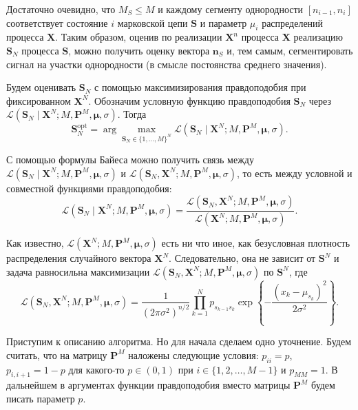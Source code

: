 Достаточно очевидно, что \(M_{S} \leq M\) и каждому сегменту однородности 
\([n_{i - 1}, n_{i}]\) соответствует состояние \(i\) марковской цепи 
\(\mathbf{S}\) и параметр \(\mu_{i}\) распределений процесса \(\mathbf{X}\). 
Таким образом, оценив по реализации \(\mathbf{X}^{n}\) процесса \(\mathbf{X}\) 
реализацию \(\mathbf{S}_{N}\) процесса \(\mathbf{S}\), можно получить оценку 
вектора \(\mathbf{n}_{S}\) и, тем самым, сегментировать сигнал на участки 
однородности (в смысле постоянства среднего значения).

Будем оценивать \(\mathbf{S}_{N}\) с помощью максимизирования правдоподобия при 
фиксированном \(\mathbf{X}^{N}\). Обозначим условную функцию правдоподобия 
\(\mathbf{S}_{N}\) через \(\mathcal{L}(\mathbf{S}_{N} \mid \mathbf{X}^{N}; M, 
\mathbf{P}^{M}, \bm{\mu}, \sigma)\). Тогда
\[
	\mathbf{S}_{N}^{\mathrm{opt}} = \arg\max\limits_{\mathbf{S}_{N} \in \{1, 
	\ldots, M\}^{N}} \mathcal{L}(\mathbf{S}_{N} \mid \mathbf{X}^{N}; M, 
	\mathbf{P}^{M}, \bm{\mu}, \sigma).
\]

С помощью формулы Байеса можно получить связь между \(\mathcal{L} 
(\mathbf{S}_{N} \mid \mathbf{X}^{N}; M, \mathbf{P}^{M}, \bm{\mu}, \sigma)\) и 
\(\mathcal{L}(\mathbf{S}_{N}, \mathbf{X}^{N}; M, \mathbf{P}^{M}, \bm{\mu}, 
\sigma)\), то есть между условной и совместной функциями правдоподобия:
\[
	\mathcal{L}(\mathbf{S}_{N} \mid \mathbf{X}^{N}; M, \mathbf{P}^{M}, 
	\bm{\mu}, \sigma) = \frac{\mathcal{L}(\mathbf{S}_{N}, \mathbf{X}^{N}; M, 
	\mathbf{P}^{M}, \bm{\mu}, \sigma)}{\mathcal{L}(\mathbf{X}^{N}; M, 
	\mathbf{P}^{M}, \bm{\mu}, \sigma)}.
\]

Как известно, \(\mathcal{L}(\mathbf{X}^{N}; M, \mathbf{P}^{M}, \bm{\mu}, 
\sigma)\) есть ни что иное, как безусловная плотность распределения случайного 
вектора \(\mathbf{X}^{N}\). Следовательно, она не зависит от \(\mathbf{S}^{N}\) 
и задача равносильна максимизации \(\mathcal{L}(\mathbf{S}_{N}, \mathbf{X}^{N}; 
M, \mathbf{P}^{M}, \bm{\mu}, \sigma)\) по \(\mathbf{S}^{N}\), где
\[
	\mathcal{L}(\mathbf{S}_{N}, \mathbf{X}^{N}; M, \mathbf{P}^{M}, \bm{\mu}, 
	\sigma) = \frac{1}{(2\pi\sigma^{2})^{n/2}} \prod_{k = 1}^{N} p_{s_{k - 
	1}s_{k}}\exp\left\{-\frac{(x_{k} - \mu_{s_{k}})^{2}}{2\sigma^{2}}\right\}.
\]

Приступим к описанию алгоритма. Но для начала сделаем одно уточнение. Будем 
считать, что на матрицу \(\mathbf{P}^{M}\) наложены следующие условия: \(p_{ii} 
= p\), \(p_{i,i + 1} = 1 - p\) для какого-то \(p \in (0, 1)\) при \(i \in \{1, 
2, \ldots, M - 1\}\) и \(p_{MM} = 1\). В дальнейшем в аргументах функции 
правдоподобия вместо матрицы \(\mathbf{P}^{M}\) будем писать параметр \(p\).

